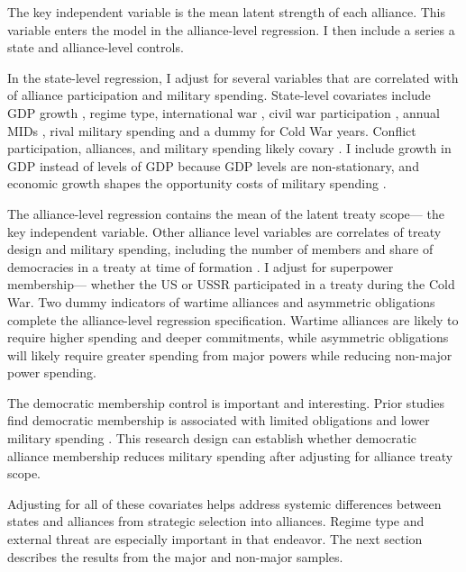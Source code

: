 \documentclass[12pt]{article}
\begin{document}
The key independent variable is the mean latent strength of each alliance. 
This variable enters the model in the alliance-level regression. 
I then include a series a state and alliance-level controls. 


In the state-level regression, I adjust for several variables that are correlated with of alliance participation and military spending. 
State-level covariates include GDP growth \citep{Boltetal2018}, regime type, international war \citep{Reiteretal2016}, civil war participation \citep{SarkeesWayman2010}, annual MIDs \citep{Gibleretal2016}, rival military spending \citep{ThompsonDreyer2012} and a dummy for Cold War years.
Conflict participation, alliances, and military spending likely covary \citep{SeneseVasquez2008}. 
I include growth in GDP instead of levels of GDP because GDP levels are non-stationary, and economic growth shapes the opportunity costs of military spending \citep{Kimball2010, Zielinskietal2017}.


The alliance-level regression contains the mean of the latent treaty scope--- the key independent variable. 
Other alliance level variables are correlates of treaty design and military spending, including the number of members and share of democracies in a treaty at time of formation \citep{Chibaetal2015}.
I adjust for superpower membership--- whether the US or USSR participated in a treaty during the Cold War. 
Two dummy indicators of wartime alliances and asymmetric obligations \citep{Leedsetal2002} complete the alliance-level regression specification. 
Wartime alliances are likely to require higher spending and deeper commitments, while asymmetric obligations will likely require greater spending from major powers while reducing non-major power spending. 


The democratic membership control is important and interesting. 
Prior studies find democratic membership is associated with limited obligations \citep{Chibaetal2015} and lower military spending \citep{DigiuseppePoast2016}.
This research design can establish whether democratic alliance membership reduces military spending after adjusting for alliance treaty scope. 


Adjusting for all of these covariates helps address systemic differences between states and alliances from strategic selection into alliances. 
Regime type and external threat are especially important in that endeavor. 
The next section describes the results from the major and non-major samples.
 
\end{document}
